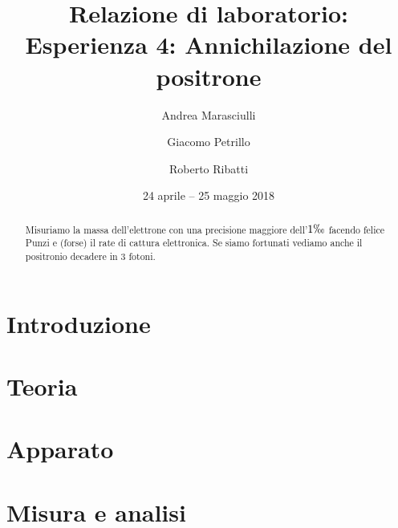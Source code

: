 \documentclass[a4paper]{article}
\title{Relazione di laboratorio:\\
Esperienza 4: Annichilazione del positrone}
\author{Andrea Marasciulli
\and Giacomo Petrillo
\and Roberto Ribatti}
\date{24 aprile -- 25 maggio 2018}
\begin{document}
\maketitle

\begin{abstract}

Misuriamo la massa dell'elettrone con una precisione maggiore dell'$1\permil$ facendo felice Punzi e (forse) il rate di cattura elettronica. Se siamo fortunati vediamo anche il positronio decadere in 3 fotoni.

\end{abstract}

{\tableofcontents}

\newpage
\section{Introduzione}




\section{Teoria}



\section{Apparato}





\section{Misura e analisi}





















\end{document}

